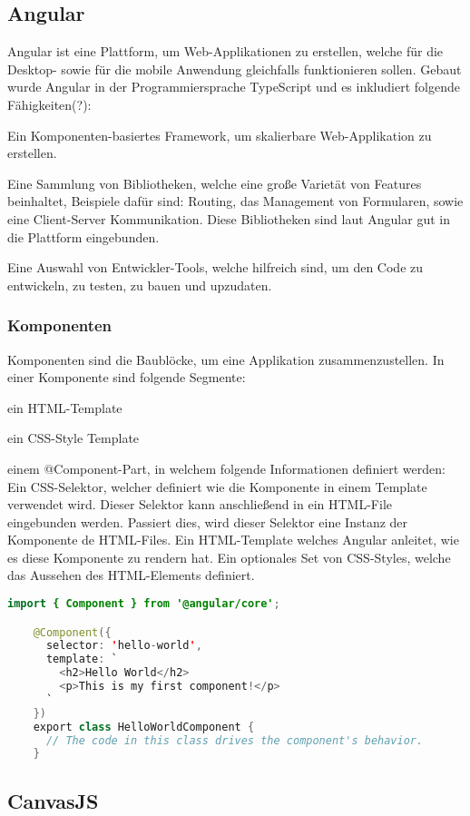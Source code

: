 \subsection{Angular}

Angular ist eine Plattform, um Web-Applikationen zu erstellen, welche für die Desktop- sowie für die mobile Anwendung gleichfalls funktionieren sollen. Gebaut wurde Angular in der Programmiersprache TypeScript und es inkludiert folgende Fähigkeiten(?):

\begin{compactitem}
    \item Ein Komponenten-basiertes Framework, um skalierbare Web-Applikation zu erstellen.
    \item Eine Sammlung von Bibliotheken, welche eine große Varietät von Features beinhaltet, Beispiele dafür sind: Routing, das Management von Formularen, sowie eine Client-Server Kommunikation. Diese Bibliotheken sind laut Angular gut in die Plattform eingebunden.       
    \item Eine Auswahl von Entwickler-Tools, welche hilfreich sind, um den Code zu entwickeln, zu testen, zu bauen und upzudaten.
\end{compactitem}

\subsubsection{Komponenten}
Komponenten sind die Baublöcke, um eine Applikation zusammenzustellen. In einer Komponente sind folgende Segmente: 

\begin{compactitem}
    \item ein HTML-Template
    \item ein CSS-Style Template      
    \item einem @Component-Part, in welchem folgende Informationen definiert werden:
    \subitem Ein CSS-Selektor, welcher definiert wie die Komponente in einem Template verwendet wird. Dieser Selektor kann anschließend in ein HTML-File eingebunden werden. Passiert dies, wird dieser Selektor eine Instanz der Komponente de HTML-Files.
    \subitem Ein HTML-Template welches Angular anleitet, wie es diese Komponente zu rendern hat.
    \subitem Ein optionales Set von CSS-Styles, welche das Aussehen des HTML-Elements definiert.
\end{compactitem}

\begin{lstlisting}[language=java,caption=Beispiel für eine minimierte Angular Komponente,label=lst:impl:angularBsp]
    import { Component } from '@angular/core';

    @Component({
      selector: 'hello-world',
      template: `
        <h2>Hello World</h2>
        <p>This is my first component!</p>
      `
    })
    export class HelloWorldComponent {
      // The code in this class drives the component's behavior.
    }
\end{lstlisting}

\subsection{CanvasJS}
